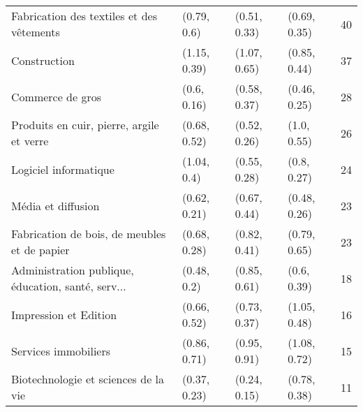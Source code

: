 \begin{tabular}{llllr}
Fabrication des textiles et des vêtements          &                         (0.79, 0.6) &    (0.51, 0.33) &  (0.69, 0.35) &             40 \\
Construction                                       &                        (1.15, 0.39) &    (1.07, 0.65) &  (0.85, 0.44) &             37 \\
Commerce de gros                                   &                         (0.6, 0.16) &    (0.58, 0.37) &  (0.46, 0.25) &             28 \\
Produits en cuir, pierre, argile et verre          &                        (0.68, 0.52) &    (0.52, 0.26) &   (1.0, 0.55) &             26 \\
Logiciel informatique                              &                         (1.04, 0.4) &    (0.55, 0.28) &   (0.8, 0.27) &             24 \\
Média et diffusion                                 &                        (0.62, 0.21) &    (0.67, 0.44) &  (0.48, 0.26) &             23 \\
Fabrication de bois, de meubles et de papier       &                        (0.68, 0.28) &    (0.82, 0.41) &  (0.79, 0.65) &             23 \\
Administration publique, éducation, santé, serv... &                         (0.48, 0.2) &    (0.85, 0.61) &   (0.6, 0.39) &             18 \\
Impression et Edition                              &                        (0.66, 0.52) &    (0.73, 0.37) &  (1.05, 0.48) &             16 \\
Services immobiliers                               &                        (0.86, 0.71) &    (0.95, 0.91) &  (1.08, 0.72) &             15 \\
Biotechnologie et sciences de la vie               &                        (0.37, 0.23) &    (0.24, 0.15) &  (0.78, 0.38) &             11 \\
\bottomrule
\end{tabular}
